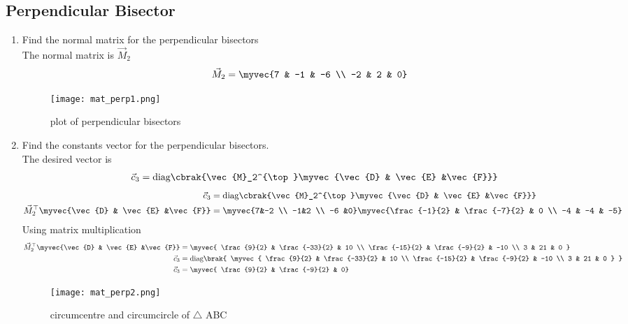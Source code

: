 \documentclass[11pt]{book}
\begin{document}
\subsection{Perpendicular Bisector}

  
\begin{enumerate}[label=\thesubsection.\arabic*.,ref=\thesubsection.\theenumi]
\item Find the normal matrix for the perpendicular bisectors \\
\solution The normal matrix is $\vec{M}_2$
\begin{align}
       \vec{M}_2 &=\myvec{7 & -1 & -6 \\ -2 & 2 & 0}
\end{align}
\begin{figure}[H]
    \centering
    \texttt{[image: mat\_perp1.png]}
    \caption{plot of perpendicular bisectors}
    \label{fig:mat_perp1}
\end{figure}
\item Find the constants vector for the perpendicular bisectors. \\
\solution The desired vector is 
\begin{align}
\vec{c}_3 = \text{diag}\cbrak{\vec{M}_2^{\top}\myvec{\vec{D} & \vec{E} &\vec{F}}}
\end{align}
\solution
\begin{align}
\vec{c}_3 &= \text{diag}\cbrak{\vec{M}_2^{\top}\myvec{\vec{D} & \vec{E} &\vec{F}}} \\
\vec{M}_2^{\top}\myvec{\vec{D} & \vec{E} &\vec{F}} &= \myvec{7&-2 \\ -1&2 \\ -6 &0}\myvec{\frac{-1}{2} & \frac{-7}{2} & 0 \\ -4 & -4 & -5} \\
\end{align}
Using matrix multiplication
\begin{align}
 \vec{M}_2^{\top}\myvec{\vec{D} & \vec{E} &\vec{F}} &=\myvec{ \frac{9}{2} & \frac{-33}{2} & 10 \\ \frac{-15}{2} & \frac{-9}{2} & -10 \\ 3 & 21 & 0 } \\
    \vec{c}_3 &= \text{diag}\brak{ \myvec{ \frac{9}{2} & \frac{-33}{2} & 10 \\ \frac{-15}{2} & \frac{-9}{2} & -10 \\ 3 & 21 & 0 } } \\
 \vec{c}_3   &= \myvec{ \frac{9}{2} & \frac{-9}{2} & 0}
\end{align}
\begin{figure}[H]
    \centering
    \texttt{[image: mat\_perp2.png]}
    \caption{circumcentre and circumcircle of $\triangle$ ABC}
    \label{fig:mat_perp2}
\end{figure}
\end{enumerate}
\end{document}
